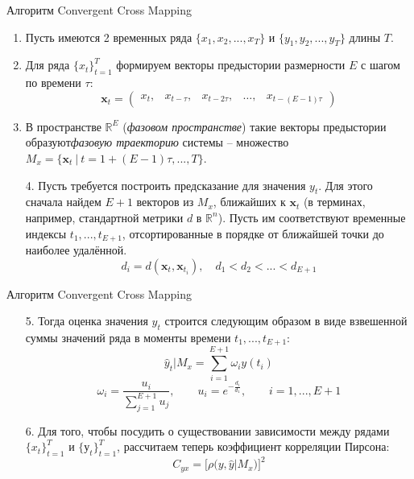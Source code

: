 \begin{frame}{Алгоритм Convergent Cross Mapping}

\begin{enumerate}
    \item Пусть имеются 2 временных ряда $\{x_1, x_2,...,x_T\}$ и $\{y_1, y_2,...,y_T\}$ длины $T$.
    \item Для ряда $\{x_t\}_{t=1}^T$ формируем векторы предыстории размерности $E$ с шагом по времени $\tau$:
    $$ \mathbf{x}_t = \begin{pmatrix}
        x_t, & x_{t - \tau}, & x_{t - 2\tau}, & \dots, & x_{t - (E-1)\tau}
    \end{pmatrix}$$
    \item В пространстве $\mathbb{R}^E$ (\textit{фазовом пространстве}) такие векторы предыстории образуют\textit{фазовую траекторию} системы -- множество $M_x = \{\mathbf{x}_t \ | \ t = 1 + (E - 1)\tau, ..., T \}$.
    \item[4.] Пусть требуется построить предсказание для значения $y_t$. Для этого сначала найдем $E + 1$ векторов из $M_x$, ближайших к $\mathbf{x}_t$ (в терминах, например, стандартной метрики $d$ в $\mathbb{R}^n$). Пусть им соответствуют временные индексы $t_1, ..., t_{E+1}$, отсортированные в порядке от ближайшей точки до наиболее удалённой.
    $$ d_i = d(\mathbf{x}_t, \mathbf{x}_{t_i}), \quad d_1 < d_2 < ... < d_{E + 1}$$
\end{enumerate}

\end{frame}

\begin{frame}{Алгоритм Convergent Cross Mapping}

\begin{enumerate}

    \item[5.] Тогда оценка значения $y_t$ строится следующим образом в виде взвешенной суммы значений ряда в моменты времени $t_1, ..., t_{E+1}$:
    $$ \hat{y}_t|M_x = \sum_{i=1}^{E+1} \omega_i y(t_i)$$
    $$ \omega_i = \frac{u_i}{\displaystyle \sum_{j=1}^{E + 1}u_j}, \quad \quad u_i = e^{\displaystyle - \frac{d_i}{d_1}}, \quad \quad i = 1, ..., E+1$$
    \item[6.] Для того, чтобы посудить о существовании зависимости между рядами $\{x_t\}_{t=1}^T$ и $\{у_t\}_{t=1}^T$, рассчитаем теперь коэффициент корреляции Пирсона:
    $$ C_{yx} = \Bigg[\rho \Big( y, \hat{y}|M_x \Big) \Bigg]^2$$

\end{enumerate}

\end{frame}

